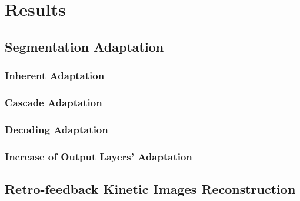 
\chapter{Results}\label{chapter:results}
\section{Segmentation Adaptation}

\subsection{Inherent Adaptation}

\subsection{Cascade Adaptation}

\subsection{Decoding Adaptation}

\subsection{Increase of Output Layers' Adaptation}

\section{Retro-feedback Kinetic Images Reconstruction}
